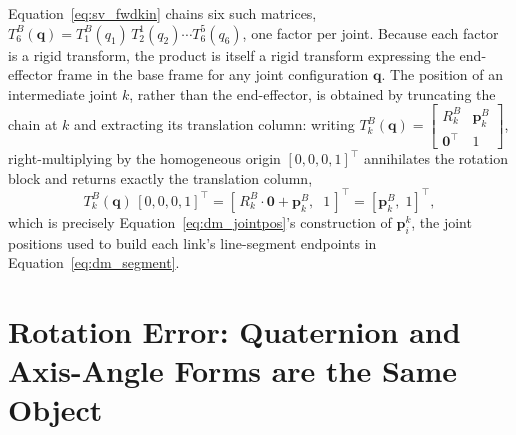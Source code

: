 Equation~\eqref{eq:sv_fwdkin} chains six such matrices, $T^{B}_{6}(\mathbf{q}) = T^{B}_{1}(q_1)\,
T^{1}_{2}(q_2) \cdots T^{5}_{6}(q_6)$, one factor per joint. Because each factor is a rigid
transform, the product is itself a rigid transform expressing the end-effector frame in the base
frame for any joint configuration $\mathbf{q}$. The position of an intermediate joint $k$, rather
than the end-effector, is obtained by truncating the chain at $k$ and extracting its translation
column: writing $T^{B}_{k}(\mathbf{q}) = \left[\begin{smallmatrix} R^{B}_{k} & \mathbf{p}^{B}_{k} \\
\mathbf{0}^\top & 1\end{smallmatrix}\right]$, right-multiplying by the homogeneous origin
$[0,0,0,1]^\top$ annihilates the rotation block and returns exactly the translation column,
\begin{equation}
T^{B}_{k}(\mathbf{q})\,[0,0,0,1]^\top = \left[\, R^{B}_{k}\cdot\mathbf{0} + \mathbf{p}^{B}_{k},\;\; 1
\,\right]^\top = [\mathbf{p}^{B}_{k},\; 1]^\top,
\label{eq:appA_originextract}
\end{equation}
which is precisely Equation~\eqref{eq:dm_jointpos}'s construction of $\mathbf{p}_i^k$, the joint
positions used to build each link's line-segment endpoints in Equation~\eqref{eq:dm_segment}.

\section{Rotation Error: Quaternion and Axis-Angle Forms are the Same Object}\label{sec:appA_rot}

